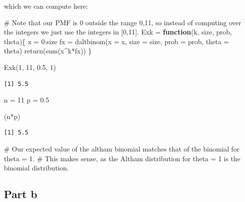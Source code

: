 \documentclass[
]{article}
\newenvironment{Shaded}{\begin{snugshade}}{\end{snugshade}}
\newcommand{\AttributeTok}[1]{\textcolor[rgb]{0.40,0.45,0.13}{#1}}
\newcommand{\CommentTok}[1]{\textcolor[rgb]{0.37,0.37,0.37}{#1}}
\newcommand{\ControlFlowTok}[1]{\textcolor[rgb]{0.00,0.23,0.31}{\textbf{#1}}}
\newcommand{\DecValTok}[1]{\textcolor[rgb]{0.68,0.00,0.00}{#1}}
\newcommand{\FloatTok}[1]{\textcolor[rgb]{0.68,0.00,0.00}{#1}}
\newcommand{\FunctionTok}[1]{\textcolor[rgb]{0.28,0.35,0.67}{#1}}
\newcommand{\NormalTok}[1]{\textcolor[rgb]{0.00,0.23,0.31}{#1}}
\newcommand{\OtherTok}[1]{\textcolor[rgb]{0.00,0.23,0.31}{#1}}
\newcommand{\SpecialCharTok}[1]{\textcolor[rgb]{0.37,0.37,0.37}{#1}}
\begin{document}
which we can compute here:

\normalsize

\begin{Shaded}
\begin{Highlighting}[numbers=left,,]
\CommentTok{\# Note that our PMF is 0 outside the range 0,11, so instead of computing over the integers we just use the integers in [0,11]. }
\NormalTok{Exk }\OtherTok{=} \ControlFlowTok{function}\NormalTok{(k, size, prob, theta)\{}
\NormalTok{  x }\OtherTok{=} \DecValTok{0}\SpecialCharTok{:}\NormalTok{size}
\NormalTok{  fx }\OtherTok{=} \FunctionTok{daltbinom}\NormalTok{(}\AttributeTok{x =}\NormalTok{ x, }\AttributeTok{size =}\NormalTok{ size, }\AttributeTok{prob =}\NormalTok{ prob, }\AttributeTok{theta =}\NormalTok{ theta)}
  \FunctionTok{return}\NormalTok{(}\FunctionTok{sum}\NormalTok{(x}\SpecialCharTok{\^{}}\NormalTok{k}\SpecialCharTok{*}\NormalTok{fx))}
\NormalTok{\}}

\FunctionTok{Exk}\NormalTok{(}\DecValTok{1}\NormalTok{, }\DecValTok{11}\NormalTok{, }\FloatTok{0.5}\NormalTok{, }\DecValTok{1}\NormalTok{)}
\end{Highlighting}
\end{Shaded}

\begin{verbatim}
[1] 5.5
\end{verbatim}

\begin{Shaded}
\begin{Highlighting}[numbers=left,,]
\NormalTok{n }\OtherTok{=} \DecValTok{11}
\NormalTok{p }\OtherTok{=} \FloatTok{0.5}

\NormalTok{(n}\SpecialCharTok{*}\NormalTok{p)}
\end{Highlighting}
\end{Shaded}

\begin{verbatim}
[1] 5.5
\end{verbatim}

\begin{Shaded}
\begin{Highlighting}[numbers=left,,]
\CommentTok{\# Our expected value of the altham binomial matches that of the binomial for theta = 1. }
\CommentTok{\# This makes sense, as the Altham distribution for theta = 1 is the binomial distribution.}
\end{Highlighting}
\end{Shaded}

\normalsize

\subsection{Part b}\label{part-b-1}
\end{document}
